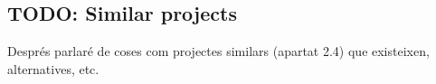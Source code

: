 
\subsection{TODO: Similar projects}

Després parlaré de coses com projectes similars (apartat 2.4) que existeixen,
alternatives, etc.
